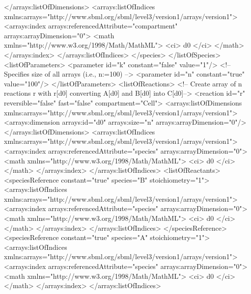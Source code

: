 \begin{example}
        </arrays:listOfDimensions>
        <arrays:listOfIndices
            xmlns:arrays="http://www.sbml.org/sbml/level3/version1/arrays/version1">
            <arrays:index arrays:referencedAttribute="compartment" arrays:arrayDimension="0">
                <math xmlns="http://www.w3.org/1998/Math/MathML">
                    <ci> d0 </ci>
                </math>
            </arrays:index>
        </arrays:listOfIndices>
    </species>
</listOfSpecies>
<listOfParameters>
    <parameter id="k" constant="false" value="1"/>
    <!-- Specifies size of all arrays (i.e., n:=100) -->
    <parameter id="n" constant="true" value="100"/>
</listOfParameters>
<listOfReactions>
    <!-- Create array of n reactions r with r[d0] converting A[d0] and B[d0] into C[d0]-->
    <reaction id="r" reversible="false" fast="false" compartment="Cell">
        <arrays:listOfDimensions
            xmlns:arrays="http://www.sbml.org/sbml/level3/version1/arrays/version1">
            <arrays:dimension arrays:id="d0" arrays:size="n" arrays:arrayDimension="0"/>
        </arrays:listOfDimensions>
        <arrays:listOfIndices
            xmlns:arrays="http://www.sbml.org/sbml/level3/version1/arrays/version1">
            <arrays:index arrays:referencedAttribute="species" arrays:arrayDimension="0">
                <math xmlns="http://www.w3.org/1998/Math/MathML">
                    <ci> d0 </ci>
                </math>
            </arrays:index>
        </arrays:listOfIndices>
        <listOfReactants>
            <speciesReference constant="true" species="B" stoichiometry="1">
                <arrays:listOfIndices
                    xmlns:arrays="http://www.sbml.org/sbml/level3/version1/arrays/version1">
                    <arrays:index arrays:referencedAttribute="species" arrays:arrayDimension="0">
                        <math xmlns="http://www.w3.org/1998/Math/MathML">
                            <ci> d0 </ci>
                        </math>
                    </arrays:index>
                </arrays:listOfIndices>
            </speciesReference>
            <speciesReference constant="true" species="A" stoichiometry="1">
                <arrays:listOfIndices
                    xmlns:arrays="http://www.sbml.org/sbml/level3/version1/arrays/version1">
                    <arrays:index arrays:referencedAttribute="species" arrays:arrayDimension="0">
                        <math
                            xmlns="http://www.w3.org/1998/Math/MathML">
                            <ci> d0 </ci>
                        </math>
                    </arrays:index>
                </arrays:listOfIndices>

\end{example}
